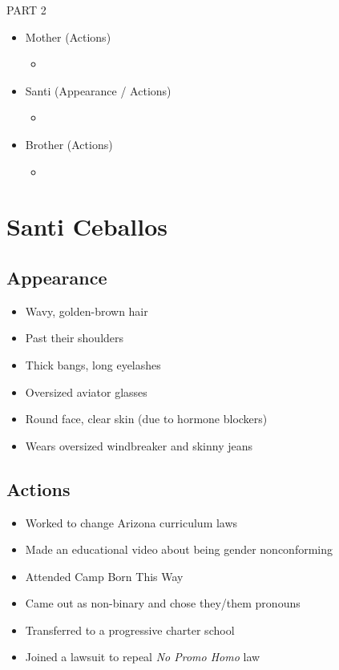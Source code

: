 \documentclass[11pt,a4paper,oneside]{article}
\begin{document}
	\begin{solution}{PART 2}
		\begin{itemize}
			\item Mother (Actions)
			\begin{itemize}
				\item 
			\end{itemize}
			\item Santi (Appearance / Actions)
			\begin{itemize}
				\item 
			\end{itemize}
			\item Brother (Actions)
			\begin{itemize}
				\item 
			\end{itemize}
		\end{itemize}
	\end{solution}
	
	
	\newpage
	
	\section*{Santi Ceballos}
	
	\subsection*{Appearance}
	\begin{itemize}
		\item Wavy, golden-brown hair
		\item Past their shoulders
		\item Thick bangs, long eyelashes
		\item Oversized aviator glasses
		\item Round face, clear skin (due to hormone blockers)
		\item Wears oversized windbreaker and skinny jeans
	\end{itemize}
	
	\subsection*{Actions}
	\begin{itemize}
		\item Worked to change Arizona curriculum laws
		\item Made an educational video about being gender nonconforming
		\item Attended Camp Born This Way
		\item Came out as non-binary and chose they/them pronouns
		\item Transferred to a progressive charter school
		\item Joined a lawsuit to repeal \emph{No Promo Homo} law
	\end{itemize}
	
\end{document}
